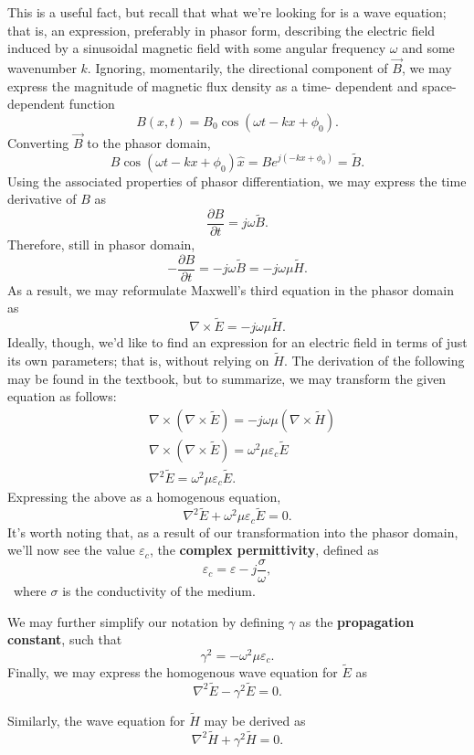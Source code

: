 \documentclass{article}
\begin{document}
This is a useful fact, but recall that what we're looking for is a wave equation; that is, an expression, preferably in phasor form, describing the electric field induced by a sinusoidal magnetic field with some angular frequency \(\omega\) and some wavenumber \(k\). Ignoring, momentarily, the directional component of \(\vec{B}\), we may express the magnitude of magnetic flux density as a time- dependent and space-dependent function
\[
	B(x,t) = B_0\cos{(\omega t - kx + \phi_0)}.
\]
Converting \(\vec{B}\) to the phasor domain,
\[
	B\cos{(\omega t - kx + \phi_0)}\hat{x} = Be^{j(-kx+\phi_0)} = \widetilde{B}.
\]
Using the associated properties of phasor differentiation, we may express the time derivative of \(B\) as
\[
	\frac{\partial B}{\partial t} = j\omega\widetilde{B}.
\]
Therefore, still in phasor domain, 
\[
	-\frac{\partial B}{\partial t} = -j\omega\widetilde{B} = -j\omega\mu\widetilde{H}. 
\]
As a result, we may reformulate Maxwell's third equation in the phasor domain as
\[
	\nabla \times \widetilde{E} = -j\omega\mu \widetilde{H}.
\]
Ideally, though, we'd like to find an expression for an electric field in terms of just its own parameters; that is, without relying on \(\widetilde{H}\). The derivation of the following may be found in the textbook, but to summarize, we may transform the given equation as follows:
\begin{align}
	&\nabla \times (\nabla \times \widetilde{E}) = -j\omega\mu(\nabla \times \widetilde{H}) \\
	&\nabla \times (\nabla \times \widetilde{E}) = \omega^2\mu\varepsilon_c\widetilde{E} \\
	&\nabla^2 \widetilde{E} = \omega^2\mu\varepsilon_c\widetilde{E}.
\end{align}
Expressing the above as a homogenous equation,
\[
	\nabla^2 \widetilde{E} + \omega^2\mu\varepsilon_c\widetilde{E} = 0.
\]
It's worth noting that, as a result of our transformation into the phasor domain, we'll now see the value \(\varepsilon_c\), the \textbf{complex permittivity}, defined as
\[
  \varepsilon_c = \varepsilon - j \frac{\sigma}{\omega},
\]\
where \(\sigma\) is the conductivity of the medium.

We may further simplify our notation by defining \(\gamma\) as the \textbf{propagation constant}, such that 
\[
  \gamma^2 = -\omega^2\mu\varepsilon_c. 
\]
Finally, we may express the homogenous wave equation for \(\widetilde{E}\) as 
\[
	\nabla^2 \widetilde{E} - \gamma^2\widetilde{E} = 0.
\]

Similarly, the wave equation for \(\widetilde{H}\) may be derived as 
\[
	\nabla^2\widetilde{H} + \gamma^2\widetilde{H} = 0.
\]
\end{document}

